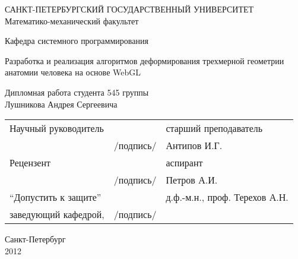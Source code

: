\thispagestyle{empty}
\begin{center}
САНКТ-ПЕТЕРБУРГСКИЙ ГОСУДАРСТВЕННЫЙ УНИВЕРСИТЕТ\\
Математико-механический факультет\\
\end{center}
\begin{center}
Кафедра системного программирования\\
\end{center}
\vspace{2cm}
\begin{center}
    \Large{Разработка и реализация алгоритмов деформирования трехмерной геометрии
 анатомии человека на основе WebGL} \\
\end{center}
\vspace{1cm}
\begin{center}
    \normalsize{Дипломная работа студента 545 группы} \\
    \large{Лушникова Андрея Сергеевича}
\end{center}
\vspace{3cm}
\noindent
\small{
\begin{center}
    \begin{tabular}{lcl}
        Научный руководитель & \dotuline{\phantom{кошерная подпись}} & старший преподаватель\\
        & /подпись/ & Антипов И.Г.\\
        Рецензент & \dotuline{\phantom{кошерная подпись}} & аспирант \\
        & /подпись/& Петров А.И. \\
        ``Допустить к защите'' & \dotuline{\phantom{кошерная подпись}} & д.ф.-м.н., проф. Терехов А.Н. \\
        заведующий кафедрой, & /подпись/& \\
    \end{tabular}
\end{center}
}
\vspace{\fill}
\begin{center}
    Санкт-Петербург\\2012
\end{center}
\pagebreak
